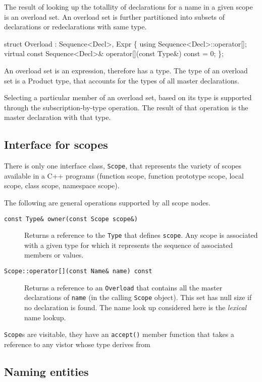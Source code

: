 \documentclass[a4paper,12pt]{article}
\begin{document}
The result of looking up the totallity of declarations for a name in a given
scope is an overload set.  An overload set is further partitioned into subsets
of declarations or redeclarations with same type.
\begin{Program}
   struct Overload : Sequence<Decl>, Expr \{
      using Sequence<Decl>::operator[];
      virtual const Sequence<Decl>& operator[](const Type&) const = 0;
   \};
\end{Program}
An overload set is an expression, therefore has a type.  The type of an
overload set is a Product type, that accounts for the types of all master
declarations.  

Selecting a particular member of an overload set, based on its type is
supported through the subscription-by-type operation.  The result of that
operation is the master declaration with that type. 

\subsection{Interface for scopes}
\label{sec:interface:scope}

There is only one interface class, \texttt{Scope}, that represents the variety
of scopes available in a C++ programs (function scope, function prototype
scope, local scope, class scope, namespace scope). 


The following are general operations supported by all scope nodes.
\begin{description}
\item[\texttt{const Type\& owner(const Scope scope\&)}]
  Returns a \const{} reference to the \texttt{Type} that defines
  \texttt{scope}.  Any scope is  associated with a given type for which it
  represents the sequence of associated members or values.

\item[\texttt{Scope::operator[](const Name\& name) const}] 
  Returns a \const{} reference to an \texttt{Overload} that contains all
  the master declarations of \texttt{name} (in the calling \texttt{Scope}
  object). 
  This set has null size if no declaration is found. The name look up
  considered here is the \emph{lexical} name lookup. 
\end{description}

\texttt{Scope}s are visitable, they have an \texttt{accept()} member function
that takes a reference to any vistor whose type derives from

\subsection{Naming entities}
\end{document}
